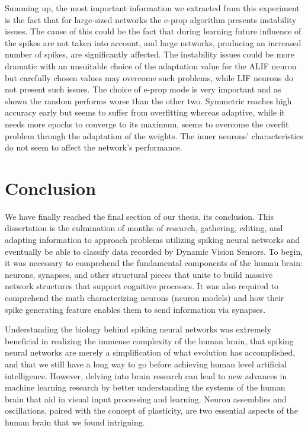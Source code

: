 \documentclass[12pt]{report}
\begin{document}
Summing up, the most important information we extracted from this experiment is the fact that for large-sized networks the e-prop algorithm presents instability issues. The cause of this could be the fact that during learning future influence of the spikes are not taken into account, and large networks, producing an increased number of spikes, are significantly affected. The instability issues could be more dramatic with an unsuitable choice of the adaptation value for the ALIF neuron but carefully chosen values may overcome such problems, while LIF neurons do not present such issues. The choice of e-prop mode is very important and as shown the random performs worse than the other two. Symmetric reaches high accuracy early but seems to suffer from overfitting whereas adaptive, while it needs more epochs to converge to its maximum, seems to overcome the overfit problem through the adaptation of the weights. The inner neurons' characteristics do not seem to affect the network's performance.

\chapter{Conclusion}

We have finally reached the final section of our thesis, its conclusion. This dissertation is the culmination of months of research, gathering, editing, and adapting information to approach problems utilizing spiking neural networks and eventually be able to classify data recorded by Dynamic Vision Sensors. To begin, it was necessary to comprehend the fundamental components of the human brain: neurons, synapses, and other structural pieces that unite to build massive network structures that support cognitive processes. It was also required to comprehend the math characterizing neurons (neuron models) and how their spike generating feature enables them to send information via synapses.

Understanding the biology behind spiking neural networks was extremely beneficial in realizing the immense complexity of the human brain, that spiking neural networks are merely a simplification of what evolution has accomplished, and that we still have a long way to go before achieving human level artificial intelligence. However, delving into brain research can lead to new advances in machine learning research by better understanding the systems of the human brain that aid in visual input processing and learning. Neuron assemblies and oscillations, paired with the concept of plasticity, are two essential aspects of the human brain that we found intriguing.
\end{document}
